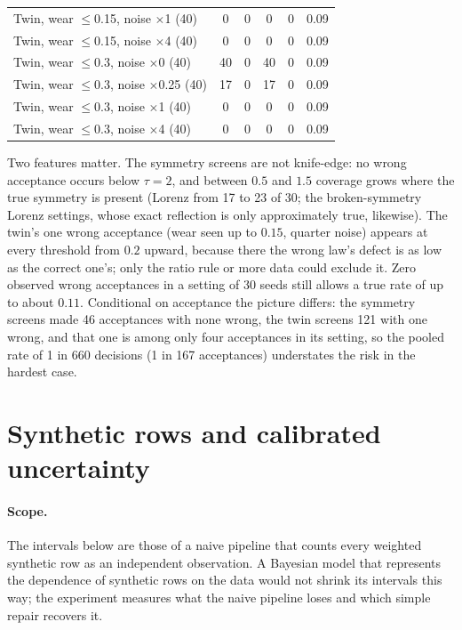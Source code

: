 \begin{table}[H]
\begin{tabular}{@{}lccccc@{}}
Twin, wear $\le$0.15, noise $\times$1 (40) & 0 & 0 & 0 & 0 & 0.09\\
Twin, wear $\le$0.15, noise $\times$4 (40) & 0 & 0 & 0 & 0 & 0.09\\
Twin, wear $\le$0.3, noise $\times$0 (40) & 40 & 0 & 40 & 0 & 0.09\\
Twin, wear $\le$0.3, noise $\times$0.25 (40) & 17 & 0 & 17 & 0 & 0.09\\
Twin, wear $\le$0.3, noise $\times$1 (40) & 0 & 0 & 0 & 0 & 0.09\\
Twin, wear $\le$0.3, noise $\times$4 (40) & 0 & 0 & 0 & 0 & 0.09\\
\bottomrule
\end{tabular}
\end{table}
Two features matter. The symmetry screens are not knife-edge: no wrong acceptance occurs below $\tau=2$, and between $0.5$ and $1.5$ coverage grows where the true symmetry is present (Lorenz from 17 to 23 of 30; the broken-symmetry Lorenz settings, whose exact reflection is only approximately true, likewise). The twin's one wrong acceptance (wear seen up to $0.15$, quarter noise) appears at every threshold from $0.2$ upward, because there the wrong law's defect is as low as the correct one's; only the ratio rule or more data could exclude it. Zero observed wrong acceptances in a setting of 30 seeds still allows a true rate of up to about $0.11$. Conditional on acceptance the picture differs: the symmetry screens made 46 acceptances with none wrong, the twin screens 121 with one wrong, and that one is among only four acceptances in its setting, so the pooled rate of 1 in 660 decisions (1 in 167 acceptances) understates the risk in the hardest case.

\section{Synthetic rows and calibrated uncertainty}\label{app:coverage}
\paragraph{Scope.} The intervals below are those of a naive pipeline that counts every weighted synthetic row as an independent observation. A Bayesian model that represents the dependence of synthetic rows on the data would not shrink its intervals this way; the experiment measures what the naive pipeline loses and which simple repair recovers it.

